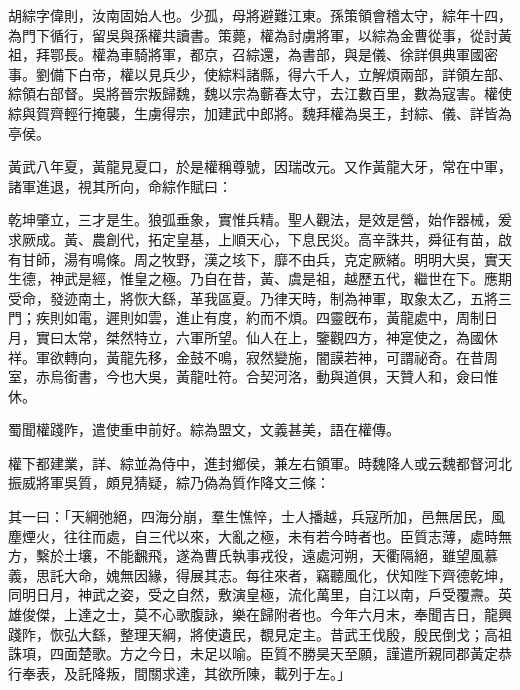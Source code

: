 \begin{pinyinscope}
 
 
 胡綜字偉則，汝南固始人也。少孤，母將避難江東。孫策領會稽太守，綜年十四，為門下循行，留吳與孫權共讀書。策薨，權為討虜將軍，以綜為金曹從事，從討黃祖，拜鄂長。權為車騎將軍，都京，召綜還，為書部，與是儀、徐詳俱典軍國密事。劉備下白帝，權以見兵少，使綜料諸縣，得六千人，立解煩兩部，詳領左部、綜領右部督。吳將晉宗叛歸魏，魏以宗為蘄春太守，去江數百里，數為寇害。權使綜與賀齊輕行掩襲，生虜得宗，加建武中郎將。魏拜權為吳王，封綜、儀、詳皆為亭侯。
 
 
 
 
 黃武八年夏，黃龍見夏口，於是權稱尊號，因瑞改元。又作黃龍大牙，常在中軍，諸軍進退，視其所向，命綜作賦曰：
 
 
 
 
 乾坤肇立，三才是生。狼弧垂象，實惟兵精。聖人觀法，是效是營，始作器械，爰求厥成。黃、農創代，拓定皇基，上順天心，下息民災。高辛誅共，舜征有苗，啟有甘師，湯有鳴條。周之牧野，漢之垓下，靡不由兵，克定厥緒。明明大吳，實天生德，神武是經，惟皇之極。乃自在昔，黃、虞是祖，越歷五代，繼世在下。應期受命，發迹南土，將恢大繇，革我區夏。乃律天時，制為神軍，取象太乙，五將三門；疾則如電，遲則如雲，進止有度，約而不煩。四靈旣布，黃龍處中，周制日月，實曰太常，桀然特立，六軍所望。仙人在上，鑒觀四方，神寔使之，為國休祥。軍欲轉向，黃龍先移，金鼓不鳴，寂然變施，闇謨若神，可謂祕奇。在昔周室，赤烏銜書，今也大吳，黃龍吐符。合契河洛，動與道俱，天贊人和，僉曰惟休。
 
 
 
 
 蜀聞權踐阼，遣使重申前好。綜為盟文，文義甚美，語在權傳。
 
 
 
 
 權下都建業，詳、綜並為侍中，進封鄉侯，兼左右領軍。時魏降人或云魏都督河北振威將軍吳質，頗見猜疑，綜乃偽為質作降文三條：
 
 
 
 
 其一曰：「天綱弛絕，四海分崩，羣生憔悴，士人播越，兵寇所加，邑無居民，風塵煙火，往往而處，自三代以來，大亂之極，未有若今時者也。臣質志薄，處時無方，繫於土壤，不能飜飛，遂為曹氏執事戎役，遠處河朔，天衢隔絕，雖望風慕義，思託大命，媿無因緣，得展其志。每往來者，竊聽風化，伏知陛下齊德乾坤，同明日月，神武之姿，受之自然，敷演皇極，流化萬里，自江以南，戶受覆燾。英雄俊傑，上達之士，莫不心歌腹詠，樂在歸附者也。今年六月末，奉聞吉日，龍興踐阼，恢弘大繇，整理天綱，將使遺民，覩見定主。昔武王伐殷，殷民倒戈；高祖誅項，四面楚歌。方之今日，未足以喻。臣質不勝昊天至願，謹遣所親同郡黃定恭行奉表，及託降叛，間關求達，其欲所陳，載列于左。」
 
 
 

\end{pinyinscope}
